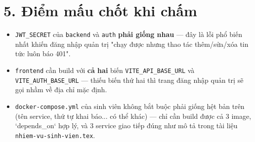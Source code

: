 \documentclass[a4paper,11pt]{article}
\begin{document}
\section*{5. Điểm mấu chốt khi chấm}

\begin{itemize}[itemsep=3pt]
  \item \texttt{JWT\_SECRET} của \texttt{backend} và \texttt{auth} \textbf{phải giống nhau} — đây là lỗi phổ biến nhất khiến đăng nhập quản trị "chạy được nhưng thao tác thêm/sửa/xóa tin tức luôn báo 401".
  \item \texttt{frontend} cần build với \textbf{cả hai} biến \texttt{VITE\_API\_BASE\_URL} và \texttt{VITE\_AUTH\_BASE\_URL} — thiếu biến thứ hai thì trang đăng nhập quản trị sẽ gọi nhầm về địa chỉ mặc định.
  \item \texttt{docker-compose.yml} của sinh viên không bắt buộc phải giống hệt bản trên (tên service, thứ tự khai báo... có thể khác) — chỉ cần build được cả 3 image, `depends\_on` hợp lý, và 3 service giao tiếp đúng như mô tả trong tài liệu \texttt{nhiem-vu-sinh-vien.tex}.
\end{itemize}
\end{document}
